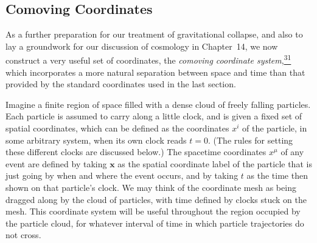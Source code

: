 
\subsection{Comoving Coordinates}\label{sec:11.8}

As a further preparation for our treatment of gravitational collapse, and
also to lay a groundwork for our discussion of cosmology in Chapter~14, we
now construct a very useful set of coordinates, the \emph{comoving coordinate
system},\hyperref[ch11-ref-31]{\textsuperscript{31}} which incorporates a more
natural separation between space and time than that provided by the standard
coordinates used in the last section.

Imagine a finite region of space filled with a dense cloud of freely falling
particles. Each particle is assumed to carry along a little clock, and is
given a fixed set of spatial coordinates, which can be defined as the
coordinates \(x^i\) of the particle, in some arbitrary system, when its own
clock reads \(t=0\). (The rules for setting these different clocks are
discussed below.) The spacetime coordinates \(x^\mu\) of any event are defined
by taking \(\mathbf{x}\) as the spatial coordinate label of the particle that
is just going by when and where the event occurs, and by taking \(t\) as the
time then shown on that particle's clock. We may think of the coordinate mesh
as being dragged along by the cloud of particles, with time defined by clocks
stuck on the mesh. This coordinate system will be useful throughout the
region occupied by the particle cloud, for whatever interval of time in which
particle trajectories do not cross.


